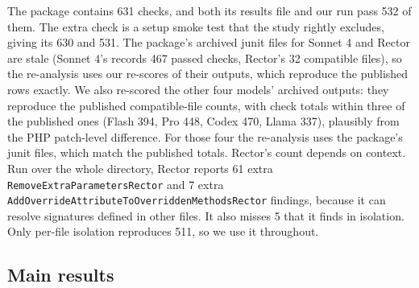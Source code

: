 \documentclass[11pt]{article}
\newcommand{\code}[1]{\texttt{#1}}
\begin{document}
The package contains 631 checks, and both its results file and our run pass 532 of them.
The extra check is a setup smoke test that the study rightly excludes, giving its 630 and 531.
The package's archived junit files for Sonnet 4 and Rector are stale (Sonnet 4's records 467 passed checks, Rector's 32 compatible files), so the re-analysis uses our re-scores of their outputs, which reproduce the published rows exactly.
We also re-scored the other four models' archived outputs: they reproduce the published compatible-file counts, with check totals within three of the published ones (Flash 394, Pro 448, Codex 470, Llama 337), plausibly from the PHP patch-level difference.
For those four the re-analysis uses the package's junit files, which match the published totals.
Rector's count depends on context.
Run over the whole directory, Rector reports 61 extra \code{RemoveExtraParametersRector} and 7 extra \code{AddOverrideAttributeToOverriddenMethodsRector} findings, because it can resolve signatures defined in other files.
It also misses 5 that it finds in isolation.
Only per-file isolation reproduces 511, so we use it throughout.

\subsection{Main results}
\end{document}

